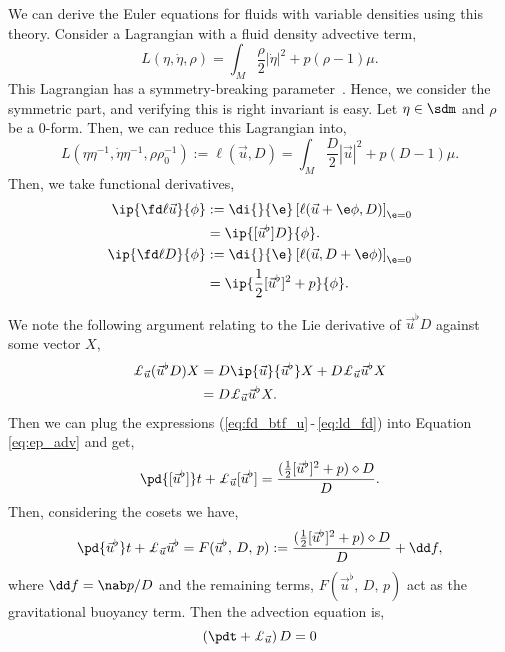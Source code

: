 \noindent
We can derive the Euler equations for fluids with variable densities using this theory. Consider a Lagrangian with a fluid density advective term,
$$ L(\eta, \dot\eta, \rho) = \int_M \frac{\rho}{2}|\dot \eta|^2 + p(\rho - 1)\mu. $$
This Lagrangian has a symmetry-breaking parameter~\cite{arthur}. Hence, we consider the symmetric part, and verifying this is right invariant is easy. Let $\eta \in \sdm$ and $\rho$ be a $0$-form. Then, we can reduce this Lagrangian into,
$$ L(\eta\eta^{-1}, \dot\eta\eta^{-1}, \rho\rho_0^{-1}) := \ell(\vec u, D) = \int_M \frac{D}{2}|\vec u|^2 + p(D-1) \mu. $$
Then, we take functional derivatives,
\begin{align}
  \ip{\fd \ell {\vec u}}{\phi} &:= \di{}{\e} \left[ \ell({\vec u} + \e \phi, D) \right]_{\e = 0}\notag \\
  &= \ip{[{\vec u}^\flat]D}{\phi}. \label{eq:fd_btf_u}\\
  \ip{\fd \ell D}{\phi} &:= \di{}{\e} \left[ \ell({\vec u}, D + \e \phi) \right]_{\e = 0}\notag \\
  &= \ip{\frac{1}{2}[{\vec u}^\flat]^2 + p}{\phi}.\label{eq:fd_btf_D}
\end{align}

\noindent
We note the following argument relating to the Lie derivative of $\vec u^\flat D$ against some vector $X$,
\begin{align}
  \pounds_{\vec u} (\vec u^\flat D) X &= D\ip{\vec u}{\vec u^\flat} X + D\pounds_{\vec u} \vec u^\flat X\notag \\
  &= D\pounds_{\vec u} \vec u^\flat X.\label{eq:ld_fd}
\end{align}
Then we can plug the expressions (\ref{eq:fd_btf_u}\,-\,\ref{eq:ld_fd}) into Equation \eqref{eq:ep_adv} and get,
$$ \pd {[{\vec u}^\flat]} t + \pounds_{\vec u} [{\vec u}^\flat] = \frac{(\frac{1}{2}[{\vec u}^\flat]^2 + p) \diamond D}{D}. $$
Then, considering the cosets we have,
$$ \pd {{\vec u}^\flat} t + \pounds_{\vec u} {\vec u}^\flat = F({\vec u}^\flat,\, D,\, p) := \frac{(\frac{1}{2}[{\vec u}^\flat]^2 + p) \diamond D}{D} + \dd f, $$
where $\dd f = \nab p / D$ and the remaining terms, $F(\vec u^\flat,\, D,\, p)$ act as the gravitational buoyancy term. Then the advection equation is,
$$ \left( \pdt + \pounds_{\vec u} \right)D = 0 $$


